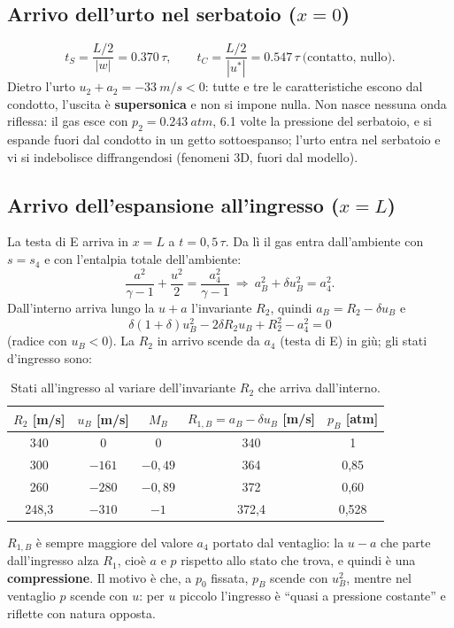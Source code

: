 \documentclass[11pt,a4paper]{article}
\newcommand{\uma}{u-a}
\newcommand{\upa}{u+a}
\begin{document}
\subsection*{Arrivo dell'urto nel serbatoio ($x=0$)}
\[
t_S=\frac{L/2}{|w|}=\num{0.370}\,\tau,\qquad t_C=\frac{L/2}{|u^*|}=\num{0.547}\,\tau\ \text{(contatto, nullo)}.
\]
Dietro l'urto $u_2+a_2=\SI{-33}{m/s}<0$: tutte e tre le caratteristiche escono dal condotto, l'uscita è
\textbf{supersonica} e non si impone nulla. Non nasce nessuna onda riflessa: il gas esce con $p_2=\SI{0.243}{atm}$,
\num{6.1} volte la pressione del serbatoio, e si espande fuori dal condotto in un getto sottoespanso; l'urto entra
nel serbatoio e vi si indebolisce diffrangendosi (fenomeni 3D, fuori dal modello).

\subsection*{Arrivo dell'espansione all'ingresso ($x=L$)}
La testa di E arriva in $x=L$ a $t=0{,}5\,\tau$. Da lì il gas entra dall'ambiente con $s=s_4$ e con l'entalpia
totale dell'ambiente:
\[
\frac{a^2}{\gamma-1}+\frac{u^2}{2}=\frac{a_4^2}{\gamma-1}\ \Rightarrow\ a_B^2+\delta u_B^2=a_4^2 .
\]
Dall'interno arriva lungo la $\upa$ l'invariante $R_2$, quindi $a_B=R_2-\delta u_B$ e
\[
\delta(1+\delta)u_B^2-2\delta R_2u_B+R_2^2-a_4^2=0
\]
(radice con $u_B<0$). La $R_2$ in arrivo scende da $a_4$ (testa di E) in giù; gli stati d'ingresso sono:
\begin{table}[H]
  \centering
  \small
  \begin{tabular}{ccccc}
    \toprule
    $R_2$ [m/s] & $u_B$ [m/s] & $M_B$ & $R_{1,B}=a_B-\delta u_B$ [m/s] & $p_B$ [atm] \\
    \midrule
    340 & 0 & 0 & 340 & 1 \\
    300 & $-161$ & $-0{,}49$ & 364 & 0,85 \\
    260 & $-280$ & $-0{,}89$ & 372 & 0,60 \\
    248,3 & $-310$ & $-1$ & 372,4 & 0,528 \\
    \bottomrule
  \end{tabular}
  \caption{Stati all'ingresso al variare dell'invariante $R_2$ che arriva dall'interno.}
  \label{tab:ingresso}
\end{table}
$R_{1,B}$ è sempre maggiore del valore $a_4$ portato dal ventaglio: la $\uma$ che parte dall'ingresso alza $R_1$, cioè
$a$ e $p$ rispetto allo stato che trova, e quindi è una \textbf{compressione}. Il motivo è che, a $p_0$ fissata,
$p_B$ scende con $u_B^2$, mentre nel ventaglio $p$ scende con $u$: per $u$ piccolo l'ingresso è ``quasi a pressione
costante'' e riflette con natura opposta.
\end{document}
